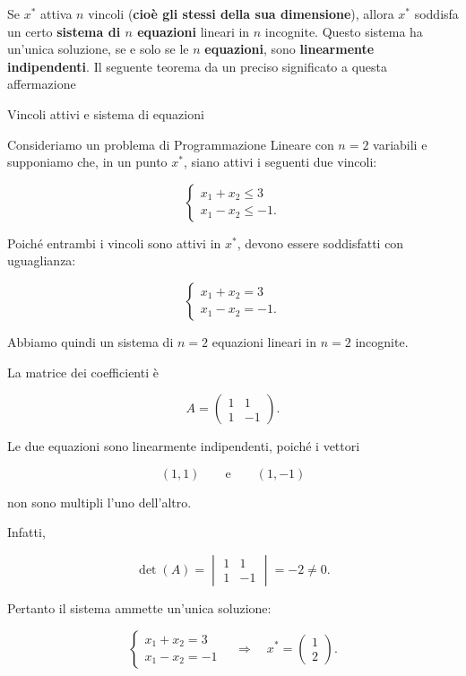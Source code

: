 \clearpage

Se $x^*$ attiva $n$ vincoli (\textbf{cioè gli stessi della sua dimensione}), allora $x^*$ soddisfa un certo \textbf{sistema di $n$ equazioni} lineari in $n$ incognite.
Questo sistema ha un'unica soluzione, se e solo se le $n$ \textbf{equazioni}, sono \textbf{linearmente indipendenti}.
Il seguente teorema da un preciso significato a questa affermazione


\begin{example}{Vincoli attivi e sistema di equazioni}

Consideriamo un problema di Programmazione Lineare con $n=2$ variabili
e supponiamo che, in un punto $x^*$, siano attivi i seguenti due
vincoli:

\[
\begin{cases}
x_1+x_2\le3\\
x_1-x_2\le-1.
\end{cases}
\]

Poiché entrambi i vincoli sono attivi in $x^*$, devono essere
soddisfatti con uguaglianza:

\[
\begin{cases}
x_1+x_2=3\\
x_1-x_2=-1.
\end{cases}
\]

Abbiamo quindi un sistema di $n=2$ equazioni lineari in $n=2$
incognite.

La matrice dei coefficienti è

\[
A=
\begin{pmatrix}
1 & 1\\
1 & -1
\end{pmatrix}.
\]

Le due equazioni sono linearmente indipendenti, poiché i vettori

\[
(1,1)
\qquad\text{e}\qquad
(1,-1)
\]

non sono multipli l'uno dell'altro.

Infatti,

\[
\det(A)
=
\begin{vmatrix}
1 & 1\\
1 & -1
\end{vmatrix}
=-2\neq0.
\]

Pertanto il sistema ammette un'unica soluzione:

\[
\begin{cases}
x_1+x_2=3\\
x_1-x_2=-1
\end{cases}
\quad\Longrightarrow\quad
x^*=
\begin{pmatrix}
1\\
2
\end{pmatrix}.
\]


\end{example}
